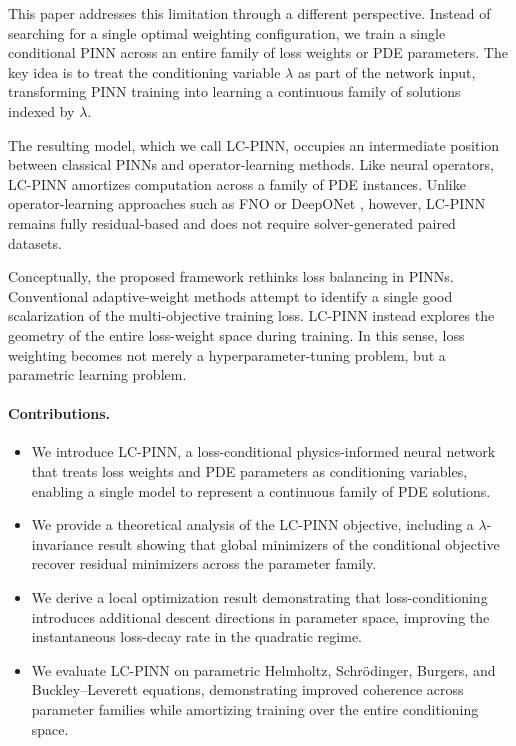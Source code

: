 \documentclass{article}
\theoremstyle{plain}
\theoremstyle{definition}
\theoremstyle{remark}
\begin{document}
This paper addresses this limitation through a different perspective.
Instead of searching for a single optimal weighting configuration, we
train a single conditional PINN across an entire family of loss
weights or PDE parameters. The key idea is to treat the conditioning
variable $\lambda$ as part of the network input, transforming PINN
training into learning a continuous family of solutions indexed by
$\lambda$.

The resulting model, which we call LC-PINN, occupies an intermediate
position between classical PINNs and operator-learning methods. Like
neural operators, LC-PINN amortizes computation across a family of PDE
instances. Unlike operator-learning approaches such as FNO
\citep{li2020fno} or DeepONet \citep{lu2021deeponet}, however,
LC-PINN remains fully residual-based and does not require
solver-generated paired datasets.

Conceptually, the proposed framework rethinks loss balancing in
PINNs. Conventional adaptive-weight methods attempt to identify a
single good scalarization of the multi-objective training loss.
LC-PINN instead explores the geometry of the entire loss-weight space
during training. In this sense, loss weighting becomes not merely a
hyperparameter-tuning problem, but a parametric learning problem.

\paragraph{Contributions.}
\begin{itemize}\setlength{\itemsep}{0pt}
   \item We introduce LC-PINN, a loss-conditional physics-informed
         neural network that treats loss weights and PDE parameters as
         conditioning variables, enabling a single model to represent
         a continuous family of PDE solutions.

   \item We provide a theoretical analysis of the LC-PINN objective,
         including a $\lambda$-invariance result showing that global
         minimizers of the conditional objective recover residual
         minimizers across the parameter family.

   \item We derive a local optimization result demonstrating that
         loss-conditioning introduces additional descent directions in
         parameter space, improving the instantaneous loss-decay rate
         in the quadratic regime.

   \item We evaluate LC-PINN on parametric Helmholtz,
         Schrödinger, Burgers, and Buckley--Leverett equations,
         demonstrating improved coherence across parameter families
         while amortizing training over the entire conditioning space.
\end{itemize}
\end{document}
